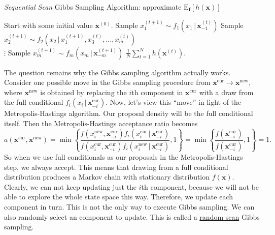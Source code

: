 \documentclass[11pt]{article}\usepackage[]{graphicx}\usepackage[]{color}
\numberwithin{algorithm}{section}
\theoremstyle{remark}
\theoremstyle{definition}
\begin{document}
\begin{algorithm}
  \caption{\textit{Sequential Scan} Gibbs Sampling Algorithm: approximate $\text{E}_{\mathbf{f}}[h(\mathbf{x})]$}
  \label{giibs}
  \begin{algorithmic}[1]
    \STATE Start with some initial value $\mathbf{x}^{(0)}$.
    \STATE Sample $x_1^{(t+1)} \sim f_1\left(x_1 \,|\, \mathbf{x}_{-1}^{(t)}\right)$
    \STATE Sample $x_2^{(t+1)} \sim f_2\left(x_2 \,|\, x_1^{(t+1)}, x_3^{(t)}, ..., x_m^{(t)}\right)$\\
      \hspace{2.3cm} $\vdots$
    \STATE Sample $x_m^{(t+1)} \sim f_m\left(x_m \,|\, \mathbf{x}_{-m}^{(t+1)}\right)$
    \ENDFOR
    \RETURN $\frac{1}{N} \sum_{t = 1}^N h(\mathbf{x}^{(t)})$.
  \end{algorithmic}
\end{algorithm}

The question remains why the Gibbs sampling algorithm actually works. Consider one possible move in
the Gibbs sampling procedure from $\mathbf{x}^{\text{cur}} \rightarrow \mathbf{x}^{\text{new}}$, where
$\mathbf{x}^{\text{new}}$ is obtained by replacing the $i$th component in $\mathbf{x}^{\text{cur}}$ with
a draw from the full conditional $f_i\left(x_i\,|\, \mathbf{x}_{-i}^{\text{cur}}\right)$. Now, let's view this ``move''
in light of the Metropolis-Hastings algorithm. Our proposal density will be the full conditional itself.
Then the Metropolis-Hastings acceptance ratio becomes
\begin{equation}
     a(\mathbf{x}^{\text{cur}},\mathbf{x}^{\text{new}}) = \min \left\{ 
       \frac{f\left(x_i^{\text{new}},\mathbf{x}^{\text{cur}}_{-i}\right) 
         f_i\left(x_i^{\text{cur}}\,|\, \mathbf{x}_{-i}^{\text{cur}}\right)}
       {f\left(x_i^{\text{cur}},\mathbf{x}_{-i}^{\text{cur}}\right) 
         f_i\left(x_i^{\text{new}}\,|\,\mathbf{x}_{-i}^{\text{cur}}\right)},
       1 \right\} =
     \min \left\{ \frac{f\left(\mathbf{x}_{-i}^{\text{cur}}\right)}{f\left(\mathbf{x}_{-i}^{\text{cur}}\right)}
     ,1 \right\} =1.
\end{equation}
So when we use full conditionals as our proposals in the Metropolis-Hastings step, we always accept. 
This means that drawing from a full conditional distribution produces a Markov chain with stationary
distribution $f(\mathbf{x})$. Clearly, we can not keep updating just the $i$th component, because
we will not be able to explore the whole state space this way. Therefore, we update each component
in turn. This is not the only way to execute Gibbs sampling. We can also randomly select an component
to update. This is called a \underline{random scan} Gibbs sampling.
\end{document}

